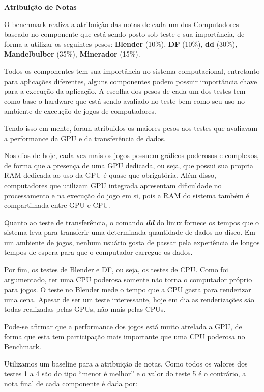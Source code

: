\documentclass[10pt,a4paper]{report}
\begin{document}
    

\begin{Large}
\textbf{Atribuição de Notas}
\newline
\end{Large}

O benchmark realiza a atribuição das notas de cada um dos Computadores baseado no componente que está sendo posto sob teste e sua importância, de forma a utilizar os seguintes pesos: \textbf{Blender} (10\%), \textbf{DF} (10\%), \textbf{dd} (30\%), \textbf{Mandelbulber} (35\%), \textbf{Minerador} (15\%).

Todos os componentes tem sua importância no sistema computacional, entretanto para aplicações diferentes, alguns componentes podem possuir importância chave para a execução da aplicação.
A escolha dos pesos de cada um dos testes tem como base o hardware que está sendo avaliado no teste bem como seu uso no ambiente de execução de jogos de computadores.

Tendo isso em mente, foram atribuidos os maiores pesos aos testes que avaliavam a performance da GPU e da transferência de dados.

Nos dias de hoje, cada vez mais os jogos possuem gráficos poderosos e complexos, de forma que a presença de uma GPU dedicada, ou seja, que possui sua propria RAM dedicada ao uso da GPU é quase que obrigatória. Além disso, computadores que utilizam GPU integrada apresentam dificuldade no processamento e na execução do jogo em si, pois a RAM do sistema também é compartilhada entre GPU e CPU.

Quanto ao teste de transferência, o comando \textbf{\textit{dd}} do linux fornece os tempos que o sistema leva para transferir uma determinada quantidade de dados no disco. Em um ambiente de jogos, nenhum usuário gosta de passar pela experiência de longos tempos de espera para que o computador carregue os dados.

Por fim, os testes de Blender e DF, ou seja, os testes de CPU. Como foi argumentado, ter uma CPU poderosa somente não torna o computador próprio para jogos. O teste no Blender mede o tempo que a CPU gasta para renderizar uma cena. Apesar de ser um teste interessante, hoje em dia as renderizações são todas realizadas pelas GPUs, não mais pelas CPUs.

Pode-se afirmar que a performance dos jogos está muito atrelada a GPU, de forma que esta tem participação mais importante que uma CPU poderosa no Benchmark.

Utilizamos um baseline para a atribuição de notas. Como todos os valores dos testes 1 a 4 são do tipo ``menor é melhor'' e o valor do teste 5 é o contrário, a nota final de cada componente é dada por:
\end{document}
